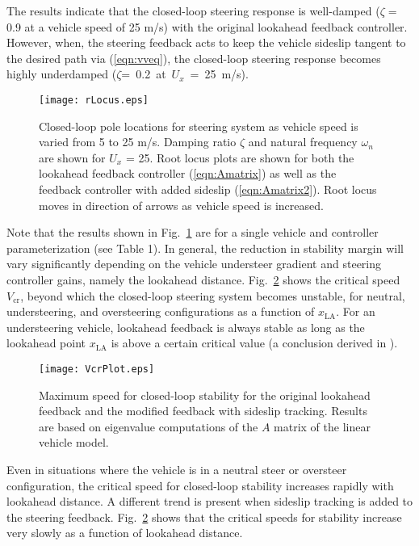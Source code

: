 The results indicate that the closed-loop steering response
is well-damped ($\zeta =$ 0.9 at a vehicle speed of 25 m/s) with the original lookahead feedback controller. However, when, the steering feedback acts to 
keep the vehicle sideslip tangent to the desired path via (\ref{eqn:vveq}), the closed-loop steering response becomes highly underdamped 
\mbox{($\zeta$= 0.2 at $U_x$ = 25 m/s)}.  

\begin{figure}[h]
\centering
\texttt{[image: rLocus.eps]}
\caption[Closed-loop pole locations for steering system as vehicle speed is varied from 5 to 25 m/s]{Closed-loop pole locations for steering system as 
vehicle speed is varied from 5 to 25 m/s. Damping ratio $\zeta$ and natural
frequency $\omega_n$ are shown for $U_x$ = 25. Root locus plots are shown for both the lookahead feedback controller (\ref{eqn:Amatrix}) as well as the feedback controller with added
sideslip (\ref{eqn:Amatrix2}). Root locus moves in direction of arrows as vehicle speed is increased.}
\label{fig:rLocusPlot}
\end{figure}
\newpage
Note that the results shown in Fig.~\ref{fig:rLocusPlot} are for a single vehicle and controller parameterization (see Table 1). 
In general, the reduction in stability margin will vary significantly depending on the vehicle understeer gradient and steering controller gains, namely
the lookahead distance. Fig.~\ref{fig:VcrPlot} shows the critical speed $V_\mathrm{cr}$, beyond which the closed-loop 
steering system becomes unstable, for neutral, understeering, and oversteering configurations as a function of $x_\mathrm{LA}$.
For an understeering vehicle, lookahead feedback is always stable as long
as the lookahead point $x_\mathrm{LA}$ is above a certain critical value (a conclusion derived in \cite{rosseter}).   
\begin{figure}[h]
\centering
\texttt{[image: VcrPlot.eps]}
\caption[Maximum speed for closed-loop stability for the original lookahead feedback and the modified feedback with sideslip tracking.]{Maximum speed for closed-loop stability for the original lookahead feedback and the modified feedback with sideslip tracking. Results are based on
eigenvalue computations of the $A$ matrix of the linear vehicle model.}
\label{fig:VcrPlot}
\end{figure} 
Even in situations where the vehicle is in a 
neutral steer or oversteer configuration, the critical speed for closed-loop stability increases rapidly with lookahead distance. A different trend is present when
sideslip tracking is added to the steering feedback. Fig.~\ref{fig:VcrPlot} shows that the critical speeds for 
stability increase very slowly as a function of lookahead distance.

